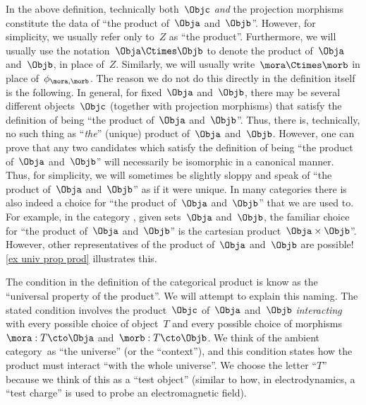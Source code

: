 \begin{remark}
  \label{prod unique up to iso}
  In the above definition, technically both~$\Objc$ \emph{and} the projection morphisms constitute the data of ``the product of~$\Obja$ and~$\Objb$''. However, for simplicity, we usually refer only to~$Z$ as ``the product''. Furthermore, we will usually use the notation~$\Obja \Ctimes \Objb$ to denote the product of~$\Obja$ and~$\Objb$, in place of~$Z$. Similarly, we will usually write~$\mora \Ctimes \morb$ in place of~$\phi_{\mora, \morb}$. The reason we do not do this directly in the definition itself is the following. In general, for fixed~$\Obja$ and~$\Objb$, there may be several different objects~$\Objc$ (together with projection morphisms) that satisfy the definition of being ``the product of~$\Obja$ and~$\Objb$''. Thus, there is, technically, no such thing as ``\emph{the}'' (unique) product of~$\Obja$ and~$\Objb$. However, one can prove that any two candidates which satisfy the definition of being ``the product of~$\Obja$ and~$\Objb$'' will necessarily be isomorphic in a canonical manner. Thus, for simplicity, we will sometimes be slightly sloppy and speak of ``the product of~$\Obja$ and~$\Objb$'' as if it were unique. In many categories there is also indeed a choice for ``the product of~$\Obja$ and~$\Objb$'' that we are used to. For example, in the category \Set, given sets~$\Obja$ and~$\Objb$, the familiar choice for ``the product of~$\Obja$ and~$\Objb$'' is the cartesian product~$\Obja \times \Objb$''. However, other representatives of the product of~$\Obja$ and~$\Objb$ are possible! \cref{ex univ prop prod} illustrates this.
\end{remark}

\begin{remark}
  The condition in the definition of the categorical product is know as the ``universal property of the product''. We will attempt to explain this naming. The stated condition involves the product~$\Objc$ of~$\Obja$ and~$\Objb$ \emph{interacting} with every possible choice of object~$T$ and every possible choice of morphisms~$\mora : T \cto \Obja$ and~$\morb: T \cto \Objb$. We think of the ambient category~\CatC as ``the universe'' (or the ``context''), and this condition states how the product must interact ``with the whole universe''.
  We choose the letter ``$T$'' because we think of this as a ``test object'' (similar \eg  to how, in electrodynamics, a ``test charge'' is used to probe an electromagnetic field).
\end{remark}


